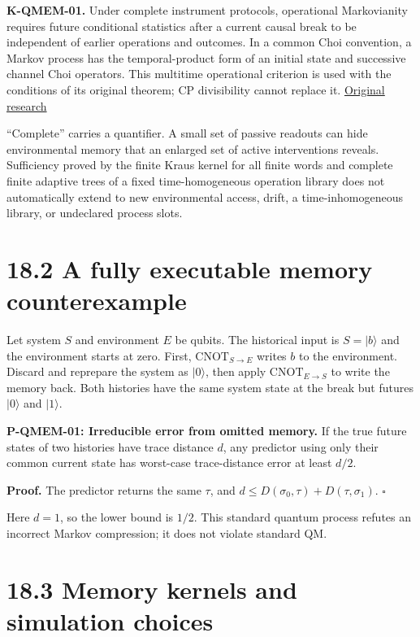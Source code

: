 \documentclass[
  11pt,
  oneside]{book}
\begin{document}
\textbf{K-QMEM-01.} Under complete instrument protocols, operational
Markovianity requires future conditional statistics after a current
causal break to be independent of earlier operations and outcomes. In a
common Choi convention, a Markov process has the temporal-product form
of an initial state and successive channel Choi operators. This
multitime operational criterion is used with the conditions of its
original theorem; CP divisibility cannot replace it.
\href{https://arxiv.org/abs/1512.00589}{Original research}

``Complete'' carries a quantifier. A small set of passive readouts can
hide environmental memory that an enlarged set of active interventions
reveals. Sufficiency proved by the finite Kraus kernel for all finite
words and complete finite adaptive trees of a fixed time-homogeneous
operation library does not automatically extend to new environmental
access, drift, a time-inhomogeneous library, or undeclared process
slots.

\section{18.2 A fully executable memory counterexample}

Let system \(S\) and environment \(E\) be qubits. The historical input
is \(S=|b\rangle\) and the environment starts at zero. First,
\(\mathrm{CNOT}_{S\to E}\) writes \(b\) to the environment. Discard and
reprepare the system as \(|0\rangle\), then apply
\(\mathrm{CNOT}_{E\to S}\) to write the memory back. Both histories have
the same system state at the break but futures \(|0\rangle\) and
\(|1\rangle\).

\label{p-qmem-01}{}

\textbf{P-QMEM-01: Irreducible error from omitted memory.} If the true
future states of two histories have trace distance \(d\), any predictor
using only their common current state has worst-case trace-distance
error at least \(d/2\).

\textbf{Proof.} The predictor returns the same \(\tau\), and
\(d\le D(\sigma_0,\tau)+D(\tau,\sigma_1)\). \(\square\)

Here \(d=1\), so the lower bound is \(1/2\). This standard quantum
process refutes an incorrect Markov compression; it does not violate
standard QM.

\section{18.3 Memory kernels and simulation choices}
\end{document}
